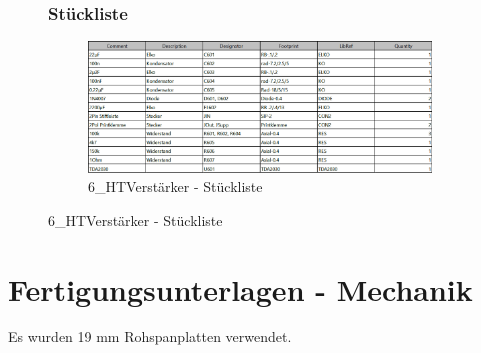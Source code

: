 \begin{figure}
	\subsubsection*{Stückliste}
	\begin{figure} [H]
		\centering
		\includegraphics[width=1\textwidth]{img/Print6/HTVerstaerker-Blist.png}
		\caption{6\_HTVerstärker - Stückliste}
		\label {fig:8.10.21}
	\end{figure}
\end{figure}



\newpage
\section{Fertigungsunterlagen - Mechanik}\label{sec:8.11}
Es wurden 19 mm Rohspanplatten verwendet.
